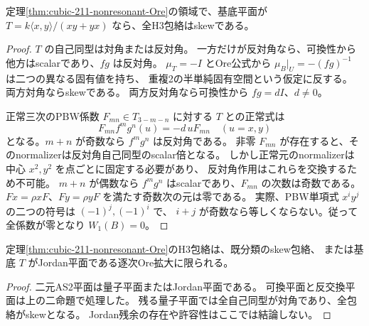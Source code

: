 \begin{proposition}[反交換基底の反対角作用の排除]
\label{prop:cubic-anticommuting-Ore-no-swap}
定理\ref{thm:cubic-211-nonresonant-Ore}の領域で、基底平面が
$T=k\langle x,y\rangle/(xy+yx)$ なら、全H3包絡はskewである。
\end{proposition}
\begin{proof}
$T$ の自己同型は対角または反対角。
一方だけが反対角なら、可換性から他方はscalarであり、$fg$ は反対角。
$\mu_T=-I$ とOre公式から $\mu_B|_U=-(fg)^{-1}$ は二つの異なる固有値を持ち、
重複2の半単純固有空間という仮定に反する。
両方対角ならskewである。
両方反対角なら可換性から $fg=dI$、$d\ne0$。

正常三次のPBW係数 $F_{mn}\in T_{3-m-n}$ に対する $T$ との正常式は
\[
 F_{mn}f^mg^n(u)=-d\,uF_{mn}\quad(u=x,y)
\]
となる。$m+n$ が奇数なら $f^mg^n$ は反対角である。
非零 $F_{mn}$ が存在すると、そのnormalizerは反対角自己同型のscalar倍となる。
しかし正常元のnormalizerは中心 $x^2,y^2$ を点ごとに固定する必要があり、
反対角作用はこれらを交換するため不可能。
$m+n$ が偶数なら $f^mg^n$ はscalarであり、$F_{mn}$ の次数は奇数である。
$F x=\rho xF$、$F y=\rho yF$ を満たす奇数次の元は零である。
実際、PBW単項式 $x^iy^j$ の二つの符号は $(-1)^j,(-1)^i$ で、
$i+j$ が奇数なら等しくならない。従って全係数が零となり $W_1(B)=0$。
\end{proof}

\begin{corollary}\label{cor:cubic-211-Jordan-residual}
定理\ref{thm:cubic-211-nonresonant-Ore}のH3包絡は、既分類のskew包絡、
または基底 $T$ がJordan平面である逐次Ore拡大に限られる。
\end{corollary}
\begin{proof}
二元AS2平面は量子平面またはJordan平面である。
可換平面と反交換平面は上の二命題で処理した。
残る量子平面では全自己同型が対角であり、全包絡がskewとなる。
Jordan残余の存在や許容性はここでは結論しない。
\end{proof}


